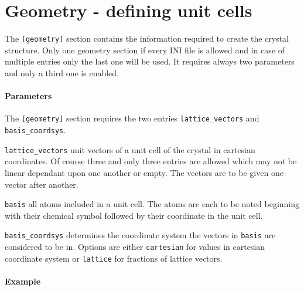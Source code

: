 \section{Geometry - defining unit cells} 
The \lstinline{[geometry]} section contains the information required to create the crystal structure. Only one geometry section if every INI file is allowed and in case of multiple entries only the last one will be used. It requires always two parameters and only a third one is enabled.

\paragraph{Parameters}
The \lstinline{[geometry]} section requires the two entries \lstinline{lattice_vectors} and \lstinline{basis_coordsys}.
\begin{description}
 \item{\lstinline{lattice_vectors}} unit vectors of a unit cell of the crystal in cartesian coordinates. Of course three and only three entries are allowed which may not be linear dependant upon one another or empty. The vectors are to be given one vector after another.
 \item{\lstinline{basis}} all atoms included in a unit cell. The atoms are each to be noted beginning with their chemical symbol followed by their coordinate in the unit cell.
 \item{\lstinline{basis_coordsys}} determines the coordinate system the vectors in \lstinline{basis} are considered to be in. Options are either \lstinline{cartesian} for values in cartesian coordinate system or \lstinline{lattice} for fractions of lattice vectors.
\end{description}

\paragraph{Example}\


